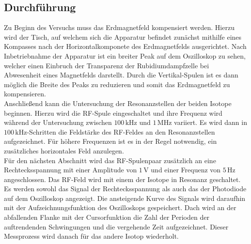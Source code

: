 \subsection{Durchführung}
Zu Beginn des Versuchs muss das Erdmagnetfeld kompensiert werden. Hierzu wird der Tisch, auf welchem sich die Apparatur befindet zunächst mithilfe eines Kompasses nach der Horizontalkomponete des Erdmagnetfelds ausgerichtet. Nach Inbetriebnahme der Apparatur ist ein breiter Peak auf dem Oszilloskop zu sehen, welcher einen Einbruch der Transparenz der Rubidiumdampfzelle bei Abwesenheit eines Magnetfelds darstellt. Durch die Vertikal-Spulen ist es dann möglich die Breite des Peaks zu reduzieren und somit das Erdmagnetfeld zu kompensieren.\\
Anschließend kann die Untersuchung der Resonanzstellen der beiden Isotope beginnen. Hierzu wird die RF-Spule eingeschaltet und ihre Frequenz wird während der Untersuchung zwischen $100\, \si{\kilo\hertz}$ und $1\,\si{\mega\hertz}$ variiert. Es wird dann in $100\, \si{\kilo\hertz}$-Schritten die Feldstärke des RF-Feldes an den Resonanzstellen aufgezeichnet. Für höhere Frequenzen ist es in der Regel notwendig, ein zusätzliches horizontales Feld anzulegen.\\
Für den nächsten Abschnitt wird das RF-Spulenpaar zusätzlich an eine Rechtecksspannung mit einer Amplitude von $1\,\si{\volt}$ und einer Frequenz von $5\,\si{\hertz}$ angeschlossen. Das RF-Feld wird mit einem der Isotope in Resonanz geschaltet. Es werden sowohl das Signal der Rechtecksspannung als auch das der Photodiode auf dem Oszilloskop angezeigt. Die ansteigende Kurve des Signals wird daraufhin mit der Aufzeichnungsfunktion des Oszilloskops gespeichert. Dach wird an der abfallenden Flanke mit der Cursorfunktion die Zahl der Perioden der auftrendenden Schwingungen und die vergehende Zeit aufgezeichnet. Dieser Messprozess wird danach für das andere Isotop wiederholt.
\clearpage
